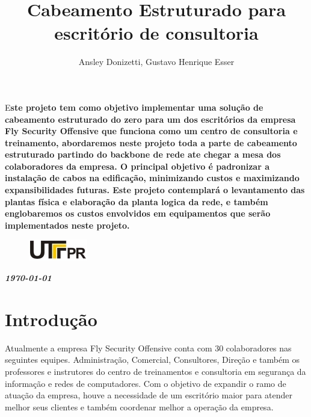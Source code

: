 \documentclass[	DIV=calc,%
							paper=a4,%
							fontsize=12pt,%
							onecolumn]{scrartcl}	 					%
\title{Cabeamento Estruturado para escritório de consultoria}					%
\author{Ansley Donizetti, Gustavo Henrique Esser}  	%
\date{}																				%
\newcommand{\initial}[1]{%
     \lettrine[lines=3,lhang=0.3,nindent=0em]{
     				\color{Black}
     				{\textsf{#1}}}{}}
\begin{document}
\maketitle
\thispagestyle{fancy} 	
\thispagestyle{empty}		%





\initial{E}\textbf{ste projeto tem como objetivo implementar uma solução de cabeamento estruturado do zero para um dos escritórios da empresa Fly Security Offensive que funciona como um centro de consultoria e treinamento, abordaremos neste projeto toda a parte de cabeamento estruturado partindo do backbone de rede ate chegar a mesa dos colaboradores da empresa. O principal objetivo é padronizar a instalação de cabos na edificação, minimizando custos e maximizando expansibilidades futuras. Este projeto contemplará o levantamento das plantas física e elaboração da planta logica da rede, e também englobaremos os custos envolvidos em equipamentos que serão implementados neste projeto. }


\begin{figure}
	\centering
	\includegraphics{utfpr}
\end{figure}

\vspace{2cm}
\centerline{\textit{\textbf{\today}}}

\clearpage
    \renewcommand*\listfigurename{Lista de figuras}
\listoffigures

\renewcommand*\listtablename{Lista de tabelas}
\listoftables


\clearpage
\renewcommand{\contentsname}{Sumário}
\tableofcontents
\clearpage

\section{Introdução}
Atualmente a empresa Fly Security Offensive conta com 30 colaboradores nas seguintes equipes. Administração, Comercial, Consultores, Direção e também os professores e instrutores do centro de treinamentos e consultoria em segurança da informação e redes de computadores. Com o objetivo de expandir o ramo de atuação da empresa, houve a necessidade de um escritório maior para atender melhor seus clientes e também coordenar melhor a operação da empresa.
\end{document}
